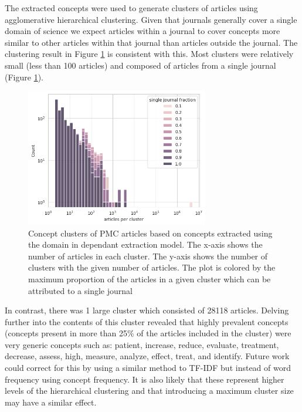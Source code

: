 \documentclass[11pt,a4paper]{article}
\begin{document}
The extracted concepts were used to generate clusters of articles using agglomerative hierarchical clustering. Given that journals generally cover a single domain of science we expect articles within a journal to cover concepts more similar to other articles within that journal than articles outside the journal. The clustering result in Figure  \ref{fig:concept-cluster-composition} is consistent with this. Most clusters were relatively small (less than 100 articles) and composed of articles from a single journal (Figure \ref{fig:concept-cluster-composition}). 

\begin{figure}
    \centering
    \includegraphics[width=8cm]{images/pmc.concepts.articles-per-cluster.png}
    \caption{Concept clusters of PMC articles based on concepts extracted using the domain in dependant extraction model. The x-axis shows the number of articles in each cluster. The y-axis shows the number of clusters with the given number of articles. The plot is colored by the maximum proportion of the articles in a given cluster which can be attributed to a single journal}
    \label{fig:concept-cluster-composition}
\end{figure}

In contrast, there was 1 large cluster which consisted of 28118 articles. Delving further into the contents of this cluster revealed that highly prevalent concepts (concepts present in more than 25\% of the articles included in the cluster) were very generic concepts such as: patient, increase, reduce, evaluate, treatment, decrease, assess, high, measure, analyze, effect, treat, and identify. \newline Future work could correct for this by using a similar method to TF-IDF but instead of word frequency using concept frequency. It is also likely that these represent higher levels of the hierarchical clustering and that introducing a maximum cluster size may have a similar effect.
\end{document}
